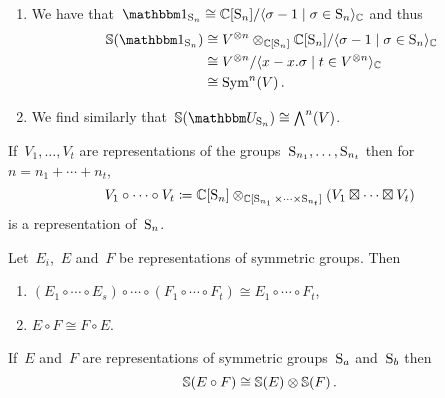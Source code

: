 \documentclass[a4paper,10pt]{scrartcl}
\begin{document}
\begin{example}
  \leavevmode
  \begin{enumerate}
    \item
      We have that~$\trivrep_{\symm_n} \cong \Complex[\symm_n]/\gen{\sigma - 1 \suchthat \sigma \in \symm_n}_{\Complex}$ and thus
      \begin{align*}
        \Schur( \trivrep_{\symm_n} )
        &\cong
        V^{\tensor n} \tensor_{\Complex[\symm_n]} \Complex[\symm_n]/\gen{\sigma - 1 \suchthat \sigma \in \symm_n}_{\Complex}
        \\
        &\cong
        V^{\tensor n}/\gen{x - x.\sigma \suchthat t \in V^{\tensor n}}_{\Complex}
        \\
        &\cong
        \Symm^n(V) \,.
      \end{align*}
    \item
      We find similarly that~$\Schur( \signrep_{\symm_n} ) \cong \Exterior^n(V)$.
  \end{enumerate}
\end{example}

If~$V_1, \dotsc, V_t$ are representations of the groups~$\operatorname{S}_{n_1}, \dotsc, \operatorname{S}_{n_t}$ then for~$n = n_1 + \dotsb + n_t$,
\[
  V_1 \circ \dotsb \circ V_t
  \coloneqq
  \mathbb{C}[\operatorname{S}_n]
  \otimes_{\mathbb{C}[\operatorname{S}_{n_1} \times \dotsb \times \operatorname{S}_{n_t}]}
  (V_1 \boxtimes \dotsb \boxtimes V_t)
\]
is a representation of~$\operatorname{S}_n$.

\begin{lemma}
  \label{properties of circle product}
  Let~$E_i$,~$E$ and~$F$ be representations of symmetric groups.
  Then
  \begin{enumerate}
    \item
      $(E_1 \circ \dotsb \circ E_s) \circ \dotsb \circ (F_1 \circ \dotsb \circ F_t) \cong E_1 \circ \dotsb \circ F_t$,
    \item
      $E \circ F \cong F \circ E$.
  \end{enumerate}
\end{lemma}

\begin{lemma}
  \label{multiplicativity of schur functor}
  If~$E$ and~$F$ are representations of symmetric groups~$\operatorname{S}_a$ and~$\operatorname{S}_b$ then
  \[
    \mathbb{S}(E \circ F) \cong \mathbb{S}(E) \otimes \mathbb{S}(F) \,.
  \]
\end{lemma}
\end{document}
